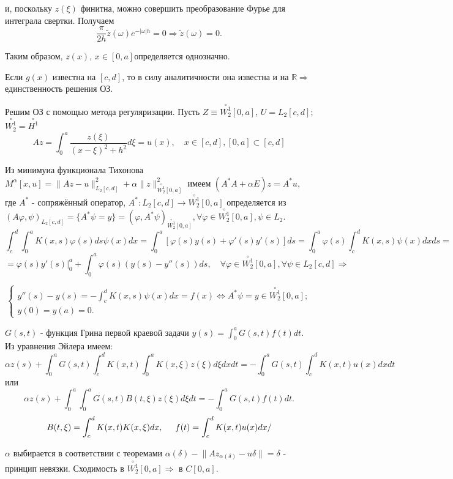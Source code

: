 \documentclass{article}
\begin{document}
и, поскольку $z(\xi)$ финитна, можно совершить преобразование Фурье для интеграла свертки. Получаем
\begin{equation*}
	\dfrac{\pi}{2h} \tilde{z}(\omega) e^{-|\omega|h} = 0 \Rightarrow \tilde{z}(\omega) = 0.
\end{equation*}

Таким образом, $z(x)$, $x \in [0,a]$определяется однозначно.

Если $g(x)$ известна на $[c,d]$, то в силу аналитичности она известна и на $\mathbb{R} \Rightarrow$  единственность решения ОЗ.

Решим ОЗ с помощью метода регуляризации. 
Пусть $Z \equiv \overset{\circ}{W_2^1}[0,a]$, $U = L_2[c,d]$; $\overset{\circ}{W_2^1} = \overset{\circ}{H^1}$
\begin{equation*}
	A z = \int_{0}^{a} \dfrac{z(\xi)}{(x-\xi)^2 + h^2} d\xi = u(x), \quad x \in [c,d], [0,a] \subset [c,d]
\end{equation*}

Из минимуиа функционала Тихонова 
$M^{\alpha} [x,u] = \lVert Az - u \rVert_{L_2[c,d]}^2 + \alpha \lVert z \rVert_{\overset{\circ}{W_2^1}[0,a]}^2$
 имеем  $(A^* A + \alpha E)z = A^* u$, где $A^*$ - сопряжённый оператор, 
 $A^* : L_2[c,d] \rightarrow \overset{\circ}{W_2^1}[0,a]$
 определяется из 
 $(A \varphi, \psi)_{L_2[c,d]} = \{A^* \psi = y\} = (\varphi, A^* \psi)_{\overset{\circ}{W_2^1}[0,a]}, \forall \varphi \in \overset{\circ}{W_2^1}[0,a], \psi \in L_2$.
\begin{equation*}
	\int_c^d \int_0^a K(x,s) \varphi(s) ds \psi(x) dx = 
	\int_0^a [ \varphi(s) y(s) + \varphi'(s) y'(s)] ds =
	\int_0^a \varphi(s) \int_c^d K(x,s) \psi(x) dx ds =
\end{equation*}
\begin{equation*}
	= \varphi(s) y'(s) \bigg|_0^a + \int_0^a \varphi(s)(y(s) - y''(s))ds, \quad
	\forall \varphi \in \overset{\circ}{W_2^1}[0,a], \forall \psi \in L_2[c,d] \Rightarrow
\end{equation*}

\begin{equation*}
\begin{cases}
	y''(s) - y(s) = - \int_c^d K(x,s) \psi(x)dx = f(x)  \Leftrightarrow A^* \psi = y \in \overset{\circ}{W_2^1}[0,a]; \\
	y(0) = y(a) = 0.
\end{cases}
\end{equation*}

$G(s,t)$ - функция Грина первой краевой задачи $y(s) = \int_0^a G(s,t) f(t) dt$. 
Из уравнения Эйлера имеем:
\begin{equation*}
	\alpha z(s) + \int_0^a G(s,t) \int_c^d K(x,t) \int_0^a K(x,\xi) z(\xi) d\xi dx dt = 
	- \int_0^a G(s,t) \int_c^d K(x,t) u(x) dx dt
\end{equation*}
или
\begin{equation*}
	\alpha z(s) + \int_0^a \int_0^a G(s,t) B(t,\xi) z(\xi) d\xi dt = -\int_0^a G(s,t) f(t)dt.
\end{equation*}
\begin{equation*}
	B(t,\xi) = \int_c^d K(x,t) K(x, \xi) dx, \hspace{0.5cm} f(t) = \int_c^d K(x,t) u(x) dx/
\end{equation*}

$\alpha$ выбирается в соответствии с теоремами $\alpha(\delta) - \lVert A z_{\alpha(\delta)} - u \delta \rVert = \delta$ - принцип невязки. Сходимость в  $\overset{\circ}{W_2^1}[0,a] \Rightarrow$ в $C[0,a]$.
\end{document}
